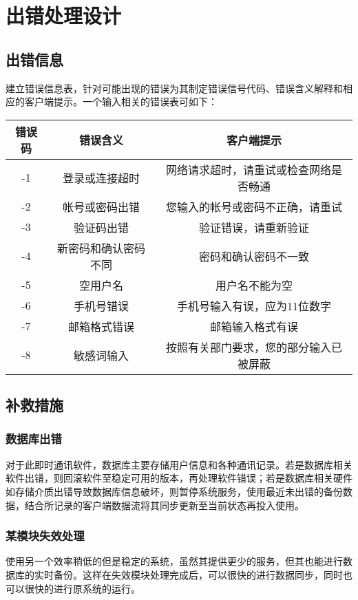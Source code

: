\chapter{出错处理设计}
\section{出错信息}
建立错误信息表，针对可能出现的错误为其制定错误信号代码、错误含义解释和相应的客户端提示。一个输入相关的错误表可如下：

\begin{tabular}{|c|c|c|}
\hline

错误码&错误含义&客户端提示 \\

\hline

-1&登录或连接超时&网络请求超时，请重试或检查网络是否畅通 \\

\hline

-2&帐号或密码出错&您输入的帐号或密码不正确，请重试 \\

\hline

-3&验证码出错&验证错误，请重新验证 \\

\hline

-4&新密码和确认密码不同&密码和确认密码不一致 \\

\hline

-5&空用户名&用户名不能为空 \\

\hline

-6&手机号错误&手机号输入有误，应为11位数字 \\

\hline

-7&邮箱格式错误&邮箱输入格式有误 \\

\hline

-8&敏感词输入&按照有关部门要求，您的部分输入已被屏蔽 \\

\hline

\end{tabular}

\section{补救措施}
\subsection{数据库出错}
对于此即时通讯软件，数据库主要存储用户信息和各种通讯记录。若是数据库相关软件出错，则回滚软件至稳定可用的版本，再处理软件错误；若是数据库相关硬件如存储介质出错导致数据库信息破坏，则暂停系统服务，使用最近未出错的备份数据，结合所记录的客户端数据流将其同步更新至当前状态再投入使用。

\subsection{某模块失效处理}
使用另一个效率稍低的但是稳定的系统，虽然其提供更少的服务，但其也能进行数据库的实时备份。这样在失效模块处理完成后，可以很快的进行数据同步，同时也可以很快的进行原系统的运行。
